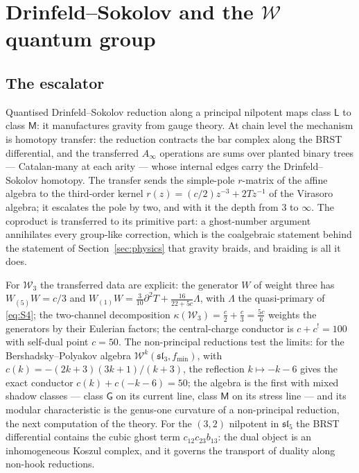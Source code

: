 \documentclass[11pt]{amsart}
\numberwithin{equation}{section}
\theoremstyle{plain}
\theoremstyle{definition}
\theoremstyle{remark}
\newcommand{\cW}{\mathcal{W}}
\begin{document}
\section{Drinfeld--Sokolov and the $\cW$ quantum group}
\label{sec:DS}

\subsection{The escalator}

Quantised Drinfeld--Sokolov reduction along a principal nilpotent maps
class $\mathsf{L}$ to class $\mathsf{M}$: it manufactures gravity from
gauge theory. At chain level the mechanism is homotopy transfer: the
reduction contracts the bar complex along the BRST differential, and
the transferred $A_\infty$ operations are sums over planted binary
trees --- Catalan-many at each arity --- whose internal edges carry the
Drinfeld--Sokolov homotopy. The transfer sends the simple-pole
$r$-matrix of the affine algebra to the third-order kernel
$r(z)=(c/2)z^{-3}+2Tz^{-1}$ of the Virasoro algebra; it escalates the
pole by two, and with it the depth from $3$ to $\infty$. The coproduct
is transferred to its primitive part: a ghost-number argument
annihilates every group-like correction, which is the coalgebraic statement behind the
statement of Section~\ref{sec:physics} that gravity braids, and
braiding is all it does.

For $\cW_3$ the transferred data are explicit: the generator $W$ of
weight three has
$W_{(5)}W=c/3$ and
$W_{(1)}W=\tfrac{3}{10}\partial^{2}T+\tfrac{16}{22+5c}\Lambda$,
with $\Lambda$ the quasi-primary of \eqref{eq:S4}; the two-channel
decomposition $\kappa(\cW_3)=\tfrac{c}{2}+\tfrac{c}{3}=\tfrac{5c}{6}$
weights the generators by their Eulerian factors; the central-charge
conductor is $c+c^{!}=100$ with self-dual point $c=50$. The
non-principal reductions test the limits: for the Bershadsky--Polyakov
algebra $\cW^{k}(\mathfrak{sl}_3,f_{\mathrm{min}})$, with
$c(k)=-(2k+3)(3k+1)/(k+3)$, the reflection $k\mapsto-k-6$ gives the
exact conductor $c(k)+c(-k-6)=50$; the algebra is the first with mixed
shadow classes --- class $\mathsf{G}$ on its current line, class
$\mathsf{M}$ on its stress line --- and its modular characteristic is
the genus-one curvature of a non-principal reduction, the next
computation of the theory. For the $(3,2)$ nilpotent in
$\mathfrak{sl}_5$ the BRST differential contains the cubic ghost term
$c_{12}c_{23}b_{13}$: the dual object is an inhomogeneous Koszul
complex, and it governs the transport of duality along non-hook
reductions.
\end{document}
